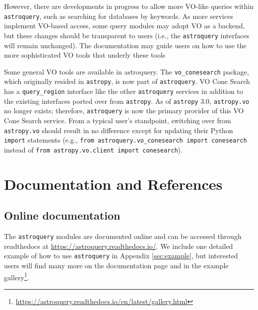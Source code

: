 \documentclass[twocolumn]{aastex62}
\newcommand{\package}[1]{\texttt{#1}\xspace}
\newcommand{\astroquery}{\package{astroquery}}
\newcommand{\astropypkg}{\package{astropy}}
\begin{document}
However, there are developments in progress to allow more VO-like queries
within \astroquery, such as searching for databases by keywords.  As more
services implement VO-based access, some query modules may adopt VO as a backend,
but these changes should be transparent to users (i.e., the \astroquery
interfaces will remain unchanged).  The documentation may guide users on how
to use the more sophisticated VO tools that underly these tools


Some general VO tools are available in astroquery.  The \texttt{vo\_conesearch}
package, which originally resided in \astropypkg, is now part of \astroquery.  VO
Cone Search has a \texttt{query\_region} interface like the other \astroquery
services in addition to the existing interfaces ported over from \astropypkg.
As of \astropypkg 3.0, \texttt{astropy.vo} no longer exists; therefore,
\astroquery is now the primary provider of this VO Cone Search service. From a
typical user's standpoint, switching over from \texttt{astropy.vo} should
result in no difference except for updating their Python \texttt{import}
statements (e.g., \texttt{from astroquery.vo\_conesearch import conesearch}
instead of \texttt{from astropy.vo.client import conesearch}).



\section{Documentation and References}
\label{sec:documentation}
\subsection{Online documentation}
The \astroquery modules are documented online and can be accessed through
readthedocs at \url{https://astroquery.readthedocs.io/}.
We include one detailed example of how to use \astroquery in Appendix \ref{sec:example},
but interested users will find many more on the documentation page and
in the example gallery\footnote{\url{https://astroquery.readthedocs.io/en/latest/gallery.html}}.
\end{document}
